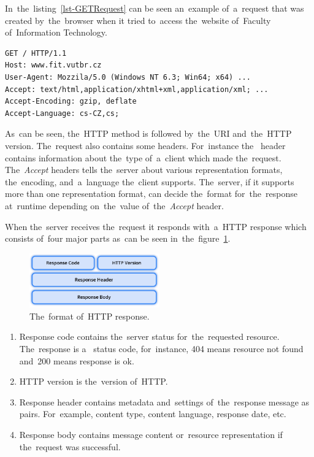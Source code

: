 In~the~listing~\ref{lst-GETRequest} can be seen an~example of~a~request that was
created by~the~browser when it tried to~access the~website of~Faculty
of~Information Technology.

\vspace{1mm}
\begin{lstlisting}[caption=An~example of~a~simplified GET request made
by~the~browser., label=lst-GETRequest, style=dp-default]
GET / HTTP/1.1
Host: www.fit.vutbr.cz
User-Agent: Mozzila/5.0 (Windows NT 6.3; Win64; x64) ...
Accept: text/html,application/xhtml+xml,application/xml; ...
Accept-Encoding: gzip, deflate
Accept-Language: cs-CZ,cs;
\end{lstlisting}

As~can be seen, the~HTTP method is followed by~the~URI and~the~HTTP version.
The~request also contains some headers. For~instance
the~ header contains information about the~type
of~a~client which made the~request. The~\textit{Accept} headers tells the~server
about various representation formats, the~encoding, and~a~language the~client
supports. The~server, if it supports more than one representation format, can
decide the~format for~the~response at~runtime depending on~the~value
of~the~\textit{Accept} header.

When the~server receives the~request it responds with~a~HTTP response which
consists of~four major parts as~can be seen
in~the~figure~\ref{fig-HTTPResponse}.

\begin{figure}[!hbt]
	\centering
	\includegraphics[width=0.5\textwidth]{./figures/http-response.pdf}
	\caption{The~format of~HTTP response.}
	\label{fig-HTTPResponse}
\end{figure}

\begin{enumerate}
  \item Response code contains the~server status for~the~requested resource.
  The~response is a~ status code, for~instance, 404 means resource
  not found and~200 means response is ok.
  \item HTTP version is the~version of~HTTP.
  \item Response header contains metadata and~settings of~the~response message
  as~ pairs. For~example, content type, content language,
  response date, etc.
  \item Response body contains message content or~resource representation if
  the~request was successful.
\end{enumerate}

